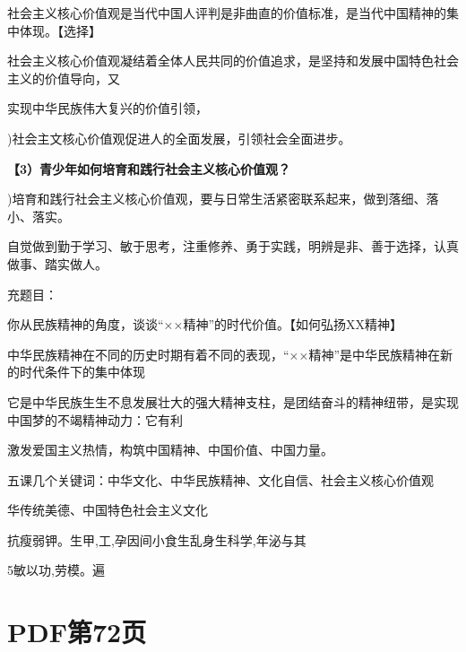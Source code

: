 \documentclass[lang=cn,11pt]{elegantbook}
\begin{document}
社会主义核心价值观是当代中国人评判是非曲直的价值标准，是当代中国精神的集中体现。【选择】\par

社会主义核心价值观凝结着全体人民共同的价值追求，是坚持和发展中国特色社会主义的价值导向，又\par

实现中华民族伟大复兴的价值引领，\par

)社会主文核心价值观促进人的全面发展，引领社会全面进步。\par

\textbf{【3）青少年如何培育和践行社会主义核心价值观？}\par

)培育和践行社会主义核心价值观，要与日常生活紧密联系起来，做到落细、落小、落实。\par

自觉做到勤于学习、敏于思考，注重修养、勇于实践，明辨是非、善于选择，认真做事、踏实做人。\par

充题目：\par

你从民族精神的角度，谈谈“××精神”的时代价值。【如何弘扬XX精神】\par

中华民族精神在不同的历史时期有着不同的表现，“××精神”是中华民族精神在新的时代条件下的集中体现\par

它是中华民族生生不息发展壮大的强大精神支柱，是团结奋斗的精神纽带，是实现中国梦的不竭精神动力：它有利\par

激发爱国主义热情，构筑中国精神、中国价值、中国力量。\par

五课几个关键词：中华文化、中华民族精神、文化自信、社会主义核心价值观\par

华传统美德、中国特色社会主义文化\par

抗瘦弱钾。生甲,工,孕因间小食生乱身生科学,年泌与其\par

5敏以功,劳模。遍\par


\section*{PDF第72页}
\end{document}
